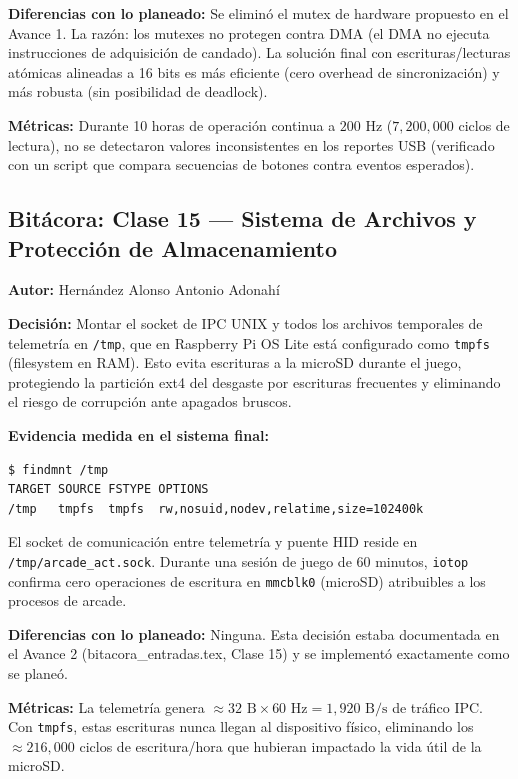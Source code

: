 \textbf{Diferencias con lo planeado:} Se eliminó el mutex de hardware propuesto en el Avance 1. La razón: los mutexes no protegen contra DMA (el DMA no ejecuta instrucciones de adquisición de candado). La solución final con escrituras/lecturas atómicas alineadas a 16 bits es más eficiente (cero overhead de sincronización) y más robusta (sin posibilidad de deadlock).

\textbf{Métricas:} Durante 10 horas de operación continua a $200\text{ Hz}$ ($7{,}200{,}000$ ciclos de lectura), no se detectaron valores inconsistentes en los reportes USB (verificado con un script que compara secuencias de botones contra eventos esperados).

\subsection{Bitácora: Clase 15 — Sistema de Archivos y Protección de Almacenamiento}
\textbf{Autor:} Hernández Alonso Antonio Adonahí

\textbf{Decisión:} Montar el socket de IPC UNIX y todos los archivos temporales de telemetría en \texttt{/tmp}, que en Raspberry Pi OS Lite está configurado como \texttt{tmpfs} (filesystem en RAM). Esto evita escrituras a la microSD durante el juego, protegiendo la partición ext4 del desgaste por escrituras frecuentes y eliminando el riesgo de corrupción ante apagados bruscos.

\textbf{Evidencia medida en el sistema final:}
\begin{lstlisting}
$ findmnt /tmp
TARGET SOURCE FSTYPE OPTIONS
/tmp   tmpfs  tmpfs  rw,nosuid,nodev,relatime,size=102400k
\end{lstlisting}

El socket de comunicación entre telemetría y puente HID reside en \texttt{/tmp/arcade\_act.sock}. Durante una sesión de juego de 60 minutos, \texttt{iotop} confirma cero operaciones de escritura en \texttt{mmcblk0} (microSD) atribuibles a los procesos de arcade.

\textbf{Diferencias con lo planeado:} Ninguna. Esta decisión estaba documentada en el Avance 2 (bitacora\_entradas.tex, Clase 15) y se implementó exactamente como se planeó.

\textbf{Métricas:} La telemetría genera $\approx 32\text{ B} \times 60\text{ Hz} = 1{,}920\text{ B/s}$ de tráfico IPC. Con \texttt{tmpfs}, estas escrituras nunca llegan al dispositivo físico, eliminando los $\approx 216{,}000$ ciclos de escritura/hora que hubieran impactado la vida útil de la microSD.

